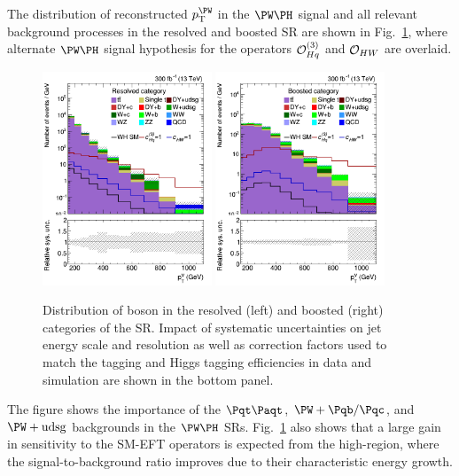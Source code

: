 \documentclass[a4paper,11pt]{article}
\newcommand{\Pb}{{{\Pqb}}\xspace}
\newcommand{\Pt}{{{\Pqt}}\xspace}
\newcommand{\Pc}{{{\Pqc}}\xspace}
\newcommand{\PAt}{{{{\Paqt}}}\xspace}
\begin{document}
The distribution of reconstructed $\pt^{\PW}$ in the $\PW\PH$ signal and all relevant background processes in the resolved and boosted SR are shown in Fig.~\ref{fig:RECO_Vpt_WH}, where alternate $\PW\PH$ signal hypothesis for the operators ${\cal O}^{(3)}_{Hq}$ and ${\cal O}_{HW}$  are overlaid. 
\begin{figure}[hbtp]
\begin{center}
\includegraphics[width=0.45\textwidth]{Figures/New/RECO/Plot_Resolved_SR_V_pt_WH.png}
\includegraphics[width=0.45\textwidth]{Figures/New/RECO/Plot_Boosted_SR_V_pt_WH.png}
\end{center}
\caption{
Distribution of \PW boson \pt in the resolved (left) and boosted (right) categories of the SR. Impact of systematic uncertainties on jet energy scale and resolution as well as correction factors used to match the \Pb tagging and Higgs tagging efficiencies in data and simulation are shown in the bottom panel.
}
\label{fig:RECO_Vpt_WH}
\end{figure}
The figure shows the importance of the $\Pt\PAt$, ${\PW}+\Pb/\Pc$, and ${\PW}+\textrm{udsg}$ backgrounds in the $\PW\PH$ SRs.
Fig.~\ref{fig:RECO_Vpt_WH} also shows that a large gain in sensitivity to the SM-EFT operators is expected from the high-\pt region, where the signal-to-background ratio improves due to their characteristic energy growth.
\end{document}
